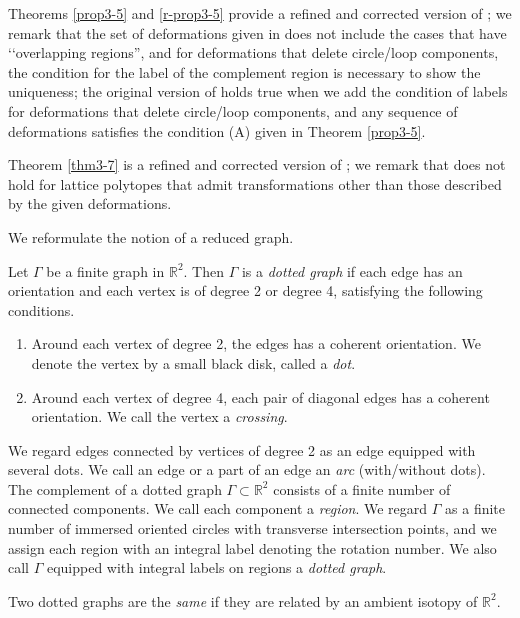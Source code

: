 \documentclass[a4paper,11pt]{amsart}
\numberwithin{equation}{section}
\begin{document}
\begin{remark}\label{rem0904}
 

Theorems \ref{prop3-5} and \ref{r-prop3-5} provide a refined and corrected version of \cite[Lemma 6.2]{N}; we remark that the set of deformations given in \cite{N} does not include the cases that have \lq\lq overlapping regions'', and for deformations that delete circle/loop components, the condition for the label of the complement region is necessary to show the uniqueness; 
the original version of \cite[Lemma 6.2]{N} holds true when we add the condition of labels for deformations that delete circle/loop components, and any sequence of deformations satisfies the condition (A) given in Theorem \ref{prop3-5}. 

Theorem \ref{thm3-7} is a refined and corrected version of \cite[Theorem 6.3]{N}; we remark that \cite[Theorem 6.3]{N} does not hold for lattice polytopes that admit transformations other than those described by the given deformations. 
\end{remark}
 

We reformulate the notion of a reduced graph. 
\begin{definition}\label{def2-1}
Let $\Gamma$ be a finite graph in $\mathbb{R}^2$. Then $\Gamma$ is a {\it dotted graph} if each edge has an orientation and each vertex is of degree 2 or degree 4, satisfying the following conditions. 
\begin{enumerate}
\item
Around each vertex of degree 2, the edges has a coherent orientation. We denote the vertex by a small black disk, called a {\it dot}.  

\item
Around each vertex of degree 4, each pair of diagonal edges has a coherent orientation. We call the vertex a {\it crossing}.

\end{enumerate}

We regard edges connected by vertices of degree 2 as an edge  equipped with several dots. We call an edge or a part of an edge an {\it arc} (with/without dots). The complement of a dotted graph $\Gamma \subset \mathbb{R}^2$ consists of a finite number of connected components. We call each component a {\it region}. We regard $\Gamma$ as a finite number of immersed oriented circles with transverse intersection points, and we assign each region with an integral label denoting the rotation number. 
%
We also call $\Gamma$ equipped with integral labels on regions a {\it dotted graph}. 

Two dotted graphs are the {\it same} if they are related by an ambient isotopy of $\mathbb{R}^2$. 

\end{definition}
\end{document}
